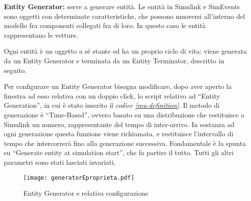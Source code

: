 \textbf{Entity Generator\cite{entitygen}:} serve a generare entità. Le entità in Simulink e SimEvents sono oggetti con determinate caratteristiche, che possono muoversi all’interno del modello fra componenti collegati fra di loro. In questo caso le entità rappresentano le vetture. 

Ogni entità è un oggetto a sé stante ed ha un proprio ciclo di vita: viene generata da un Entity Generator e terminata da un Entity Terminator, descritto in seguito.

Per configurare un Entity Generator bisogna modificare, dopo aver aperto la finestra ad esso relativa con un doppio click, lo script relativo ad “Entity Generation”, in cui è stato inserito il \textit{codice \ref{mu-definition}}. Il metodo di generazione è “Time-Based”, ovvero basato su una distribuzione che restituisce a Simulink un numero, rappresentante del tempo di inter-arrivo. In sostanza ad ogni generazione questa funzione viene richiamata, e restituisce l’intervallo di tempo che intercorrerà fino alla generazione successiva. Fondamentale è la spunta su “Generate entity at simulation start”, che fa partire il tutto. Tutti gli altri parametri sono stati lasciati invariati.
\newline
\begin{figure}[H]
  \texttt{[image: generatorEproprieta.pdf]}
  \caption{Entity Generator e relativa configurazione}
  \label{fig:entitygenandprops}
\end{figure}
\newpage


